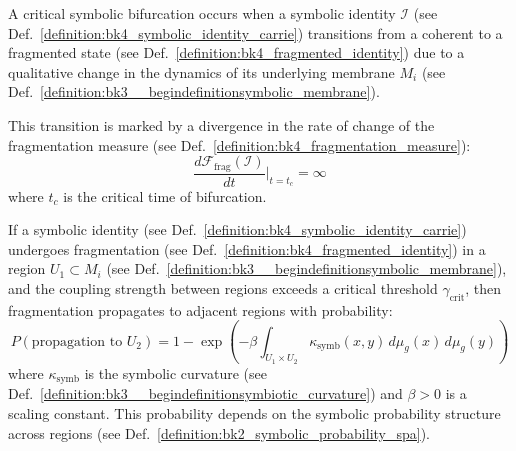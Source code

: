 \begin{definition} \label{definition:bk4_critical_symbolic_bifurc}
A critical symbolic bifurcation occurs when a symbolic identity $\mathcal{I}$ (see Def.~\ref{definition:bk4_symbolic_identity_carrie}) transitions from a coherent to a fragmented state (see Def.~\ref{definition:bk4_fragmented_identity}) due to a qualitative change in the dynamics of its underlying membrane $M_i$ (see Def.~\ref{definition:bk3__begindefinitionsymbolic_membrane}).

This transition is marked by a divergence in the rate of change of the fragmentation measure (see Def.~\ref{definition:bk4_fragmentation_measure}):
\begin{equation}
    \frac{d\mathcal{F}_{\text{frag}}(\mathcal{I})}{dt}\Big|_{t=t_c} = \infty
\end{equation}
where $t_c$ is the critical time of bifurcation.
\end{definition}
\begin{lemma} \label{lemma:bk4_fragmentation_cascade}
If a symbolic identity (see Def.~\ref{definition:bk4_symbolic_identity_carrie}) undergoes fragmentation (see Def.~\ref{definition:bk4_fragmented_identity}) in a region $U_1 \subset M_i$ (see Def.~\ref{definition:bk3__begindefinitionsymbolic_membrane}), and the coupling strength between regions exceeds a critical threshold $\gamma_{\text{crit}}$, then fragmentation propagates to adjacent regions with probability:
\begin{equation}
    P(\text{propagation to } U_2) = 1 - \exp\left(-\beta \int_{U_1 \times U_2} \kappa_{\text{symb}}(x,y) \, d\mu_g(x) \, d\mu_g(y)\right)
\end{equation}
where $\kappa_{\text{symb}}$ is the symbolic curvature (see Def.~\ref{definition:bk3__begindefinitionsymbiotic_curvature}) and $\beta > 0$ is a scaling constant. This probability depends on the symbolic probability structure across regions (see Def.~\ref{definition:bk2_symbolic_probability_spa}).
\end{lemma}
